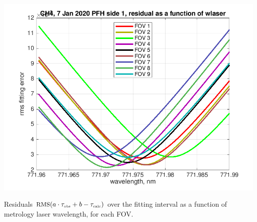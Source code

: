 \documentclass[10pt]{beamer}
\begin{document}
\begin{frame}
\begin{columns}[t]
\begin{column}{0.5\textwidth}
  \begin{centering}
  \includegraphics[width=\textwidth]{01-07_pfl_s1_CH4/CH4_wlaser_fit.png}
  \end{centering}\vspace{3mm}

Residuals $\mbox{\small RMS}(a\cdot\tau_{\mbox{\tiny obs}} + b - \tau_{\mbox{\tiny calc}})$ over the fitting
interval as a function of metrology laser wavelength, for each FOV.

\end{column}
\end{columns}
\end{frame}
\end{document}
